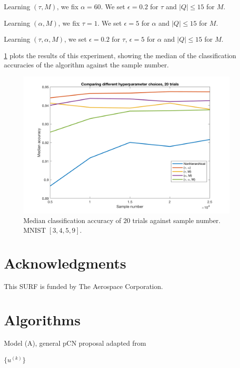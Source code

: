 \documentclass{siamart1116}
\begin{document}
    Learning $(\tau, M)$, we fix $\alpha=60$. We set $\epsilon=0.2$ for $\tau$ and $|Q| \le 15$ for $M$.

    Learning $(\alpha, M)$, we fix $\tau=1$. We set $\epsilon=5$ for $\alpha$ and $|Q| \le 15$ for $M$.

    Learning $(\tau, \alpha, M)$, we set $\epsilon=0.2$ for $\tau$, $\epsilon=5$ for $\alpha$ and $|Q| \le 15$ for $M$.

    \cref{fig:compare_all_1_20} plots the results of this experiment, showing the median of the classification accuracies of the algorithm against the sample number.

    \begin{figure}[!htb]
        \centering
        \caption{\label{fig:compare_all_1_20} Median classification accuracy of $20$ trials against sample number. MNIST $[3, 4, 5, 9]$.}
        \includegraphics[width=0.8\linewidth]{compare_all/1-20.png}
    \end{figure}

\section*{Acknowledgments}
    This SURF is funded by The Aerospace Corporation.

\appendix
    \section{Algorithms} \label{appendix:algorithms}
        \begin{algorithm}
            \caption{Model (A), general pCN proposal adapted from \cite{CoRoStWh13}}
            \label{alg:generalpCN}
            \begin{algorithmic}[1]
            \EndFor
            \State \Return $\{u^{(k)}\}$
            \end{algorithmic}
        \end{algorithm}
\end{document}
